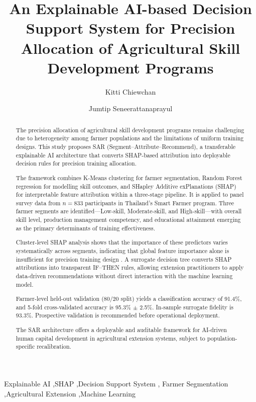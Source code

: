 \documentclass[3p,twocolumn,authoryear]{elsarticle}
\begin{document}
\begin{frontmatter}

\title{An Explainable AI-based Decision Support System for Precision
       Allocation of Agricultural Skill Development Programs}

\author[inst1]{Kitti Chiewchan}
\author[inst2]{Jumtip Seneerattanaprayul}

\address[inst1]{Computer Education, Faculty of Education,
  Bansomdejchaopraya Rajabhat University,
  1061 Issaraphap Road, Hirunrujee, Thonburi, Bangkok 10600, Thailand}
\address[inst2]{Department of Agricultural Economics,
  Faculty of Economics, Kasetsart University,
  50 Ngam Wong Wan Road, Ladyao, Jatujak, Bangkok 10110, Thailand}

\begin{abstract}
The precision allocation of agricultural skill development programs remains
challenging due to heterogeneity among farmer populations and the limitations of
uniform training designs.
This study proposes SAR (Segment--Attribute--Recommend), a transferable
explainable AI architecture that converts SHAP-based attribution into deployable
decision rules for precision training allocation.

The framework combines K-Means clustering for farmer segmentation, Random Forest
regression for modelling skill outcomes, and SHapley Additive exPlanations (SHAP)
for interpretable feature attribution within a three-stage pipeline.
It is applied to panel survey data from $n = 833$ participants in Thailand's Smart
Farmer program.
Three farmer segments are identified---Low-skill, Moderate-skill, and
High-skill---with overall skill level, production management competency, and
educational attainment emerging as the primary determinants of training
effectiveness.

Cluster-level SHAP analysis shows that the importance of these predictors varies
systematically across segments, indicating that global feature importance alone is
insufficient for precision training design \citep{lundberg2020}.
A surrogate decision tree converts SHAP attributions into transparent IF--THEN
rules, allowing extension practitioners to apply data-driven recommendations
without direct interaction with the machine learning model.

Farmer-level held-out validation (80/20 split) yields a classification accuracy of
91.4\%, and 5-fold cross-validated accuracy is 95.3\% $\pm$ 2.5\%.
In-sample surrogate fidelity is 93.3\%.
Prospective validation is recommended before operational deployment.

The SAR architecture offers a deployable and auditable framework for AI-driven
human capital development in agricultural extension systems, subject to
population-specific recalibration.
\end{abstract}

\begin{keyword}
Explainable AI \sep SHAP \sep Decision Support System \sep
Farmer Segmentation \sep Agricultural Extension \sep Machine Learning
\end{keyword}

\end{frontmatter}
\end{document}

